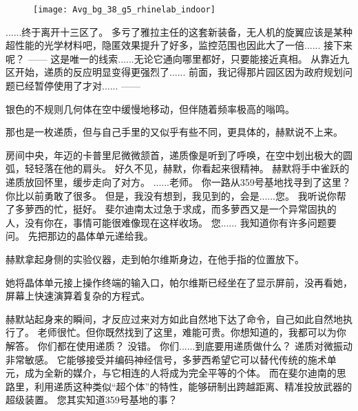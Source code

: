 \documentclass[openany]{book}
\begin{document}
\begin{figure}[h]
    \centering
    \texttt{[image: Avg\_bg\_38\_g5\_rhinelab\_indoor]}
\end{figure}
\begin{dialogue}
     ......终于离开十三区了。
     多亏了雅拉主任的这套新装备，无人机的旋翼应该是某种超性能的光学材料吧，隐匿效果提升了好多，监控范围也因此大了一倍......
     接下来呢？
     ——
     这是唯一的线索......无论它通向哪里都好，只要能接近真相。
     从靠近九区开始，递质的反应明显变得更强烈了......
     前面，我记得那片园区因为政府规划问题已经暂停使用了才对......
     ——\par
    银色的不规则几何体在空中缓慢地移动，但伴随着频率极高的嗡鸣。\par
    那也是一枚递质，但与自己手里的又似乎有些不同，更具体的，赫默说不上来。\par
    房间中央，年迈的卡普里尼微微颔首，递质像是听到了呼唤，在空中划出极大的圆弧，轻轻落在他的肩头。
     好久不见，赫默，你看起来很精神。
    赫默将手中雀跃的递质放回怀里，缓步走向了对方。
     ......老师。
     你一路从359号基地找寻到了这里？你比以前勇敢了很多。
     但是，我没有想到，我见到的，会是......您。
     我听说你帮了多萝西的忙，挺好。
     斐尔迪南太过急于求成，而多萝西又是一个异常固执的人，没有你在，事情可能很难像现在这样收场。
     您......
     我知道你有许多问题要问。
     先把那边的晶体单元递给我。\par
    赫默拿起身侧的实验仪器，走到帕尔维斯身边，在他手指的位置放下。\par
    她将晶体单元接上操作终端的输入口，帕尔维斯已经坐在了显示屏前，没再看她，屏幕上快速演算着复杂的方程式。\par
    赫默站起身来的瞬间，才反应过来对方如此自然地下达了命令，自己如此自然地执行了。
     老师很忙。但你既然找到了这里，难能可贵。你想知道的，我都可以为你解答。
     你们都在使用递质？
     没错。
     你们......到底要用递质做什么？
     递质对微振动非常敏感。
     它能够接受并编码神经信号，多萝西希望它可以替代传统的施术单元，成为全新的媒介，与它相连的人将成为完全平等的个体。
     而在斐尔迪南的思路里，利用递质这种类似“超个体”的特性，能够研制出跨越距离、精准投放武器的超级装置。
     您其实知道359号基地的事？\par

\end{dialogue}
\end{document}
